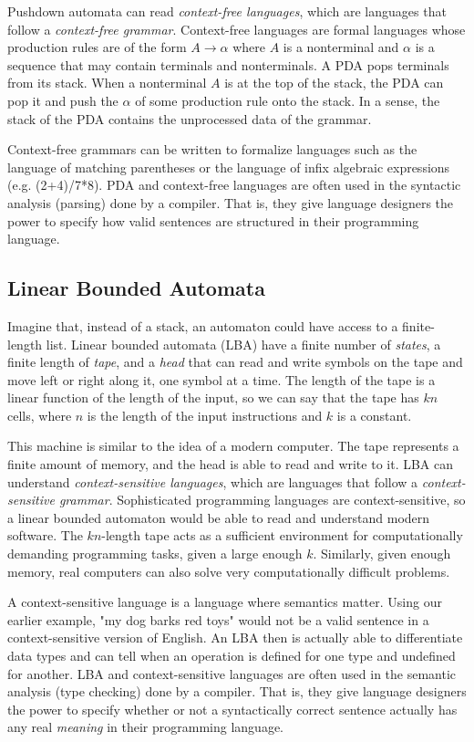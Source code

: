 Pushdown automata can read \textit{context-free languages}, which are languages that follow a \textit{context-free grammar}. Context-free languages are formal languages whose production rules are of the form $A\rightarrow\alpha$ where $A$ is a nonterminal and $\alpha$ is a sequence that may contain terminals and nonterminals. A PDA pops terminals from its stack. When a nonterminal $A$ is at the top of the stack, the PDA can pop it and push the $\alpha$ of some production rule onto the stack. In a sense, the stack of the PDA contains the unprocessed data of the grammar.

Context-free grammars can be written to formalize languages such as the language of matching parentheses or the language of infix algebraic expressions (e.g. (2+4)/7*8). PDA and context-free languages are often used in the syntactic analysis (parsing) done by a compiler. That is, they give language designers the power to specify how valid sentences are structured in their programming language.

\subsection{Linear Bounded Automata}

Imagine that, instead of a stack, an automaton could have access to a finite-length list. Linear bounded automata (LBA) have a finite number of \textit{states}, a finite length of \textit{tape}, and a \textit{head} that can read and write symbols on the tape and move left or right along it, one symbol at a time. The length of the tape is a linear function of the length of the input, so we can say that the tape has $kn$ cells, where $n$ is the length of the input instructions and $k$ is a constant.

This machine is similar to the idea of a modern computer. The tape represents a finite amount of memory, and the head is able to read and write to it. LBA can understand \textit{context-sensitive languages}, which are languages that follow a \textit{context-sensitive grammar}. Sophisticated programming languages are context-sensitive, so a linear bounded automaton would be able to read and understand modern software. The $kn$-length tape acts as a sufficient environment for computationally demanding programming tasks, given a large enough $k$. Similarly, given enough memory, real computers can also solve very computationally difficult problems.

A context-sensitive language is a language where semantics matter. Using our earlier example, "my dog barks red toys" would not be a valid sentence in a context-sensitive version of English. An LBA then is actually able to differentiate data types and can tell when an operation is defined for one type and undefined for another. LBA and context-sensitive languages are often used in the semantic analysis (type checking) done by a compiler. That is, they give language designers the power to specify whether or not a syntactically correct sentence actually has any real \textit{meaning} in their programming language.

